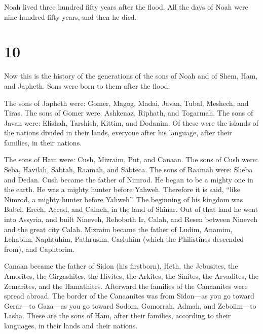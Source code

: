 Noah lived three hundred fifty years after the flood.
 All the days of Noah were nine hundred fifty years, and
then he died.

\hypertarget{section-9}{%
\section{10}\label{section-9}}

 Now this is the history of the generations of the sons of
Noah and of Shem, Ham, and Japheth. Sons were born to them after the
flood.

 The sons of Japheth were: Gomer, Magog, Madai, Javan,
Tubal, Meshech, and Tiras.  The sons of Gomer were:
Ashkenaz, Riphath, and Togarmah.  The sons of Javan were:
Elishah, Tarshish, Kittim, and Dodanim.  Of these were the
islands of the nations divided in their lands, everyone after his
language, after their families, in their nations.

 The sons of Ham were: Cush, Mizraim, Put, and Canaan.
 The sons of Cush were: Seba, Havilah, Sabtah, Raamah, and
Sabteca. The sons of Raamah were: Sheba and Dedan.  Cush
became the father of Nimrod. He began to be a mighty one in the earth.
 He was a mighty hunter before Yahweh. Therefore it is said,
``like Nimrod, a mighty hunter before Yahweh''.  The
beginning of his kingdom was Babel, Erech, Accad, and Calneh, in the
land of Shinar.  Out of that land he went into Assyria, and
built Nineveh, Rehoboth Ir, Calah,  and Resen between
Nineveh and the great city Calah.  Mizraim became the
father of Ludim, Anamim, Lehabim, Naphtuhim,  Pathrusim,
Casluhim (which the Philistines descended from), and Caphtorim.

 Canaan became the father of Sidon (his firstborn), Heth,
 the Jebusites, the Amorites, the Girgashites,
 the Hivites, the Arkites, the Sinites,  the
Arvadites, the Zemarites, and the Hamathites. Afterward the families of
the Canaanites were spread abroad.  The border of the
Canaanites was from Sidon---as you go toward Gerar---to Gaza---as you go
toward Sodom, Gomorrah, Admah, and Zeboiim---to Lasha. 
These are the sons of Ham, after their families, according to their
languages, in their lands and their nations.

